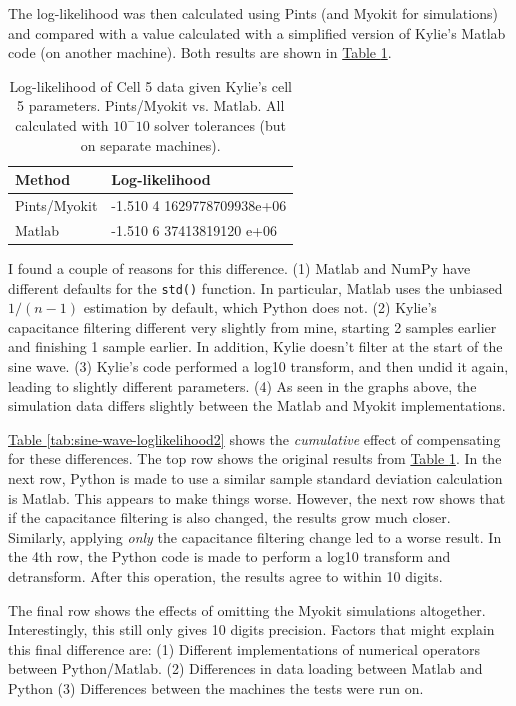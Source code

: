 \documentclass[preprint,authoryear,10pt]{elsarticle}
\newcommand{\startrowcolors}{\rowcolors{2}{gray!15}{white}}
\newcommand*{\thead}[1]{\bfseries #1}
\newcommand{\tab}[1]{\hyperref[tab:#1]{Table \ref*{tab:#1}}}
\newcommand{\Tab}[1]{\hyperref[tab:#1]{Table \ref*{tab:#1}}}
\newcommand{\code}[1]{\texttt{#1}}
\begin{document}
The log-likelihood was then calculated using Pints (and Myokit for simulations)
 and compared with a value calculated with a simplified version of Kylie's
 Matlab code (on another machine).
Both results are shown in \tab{sine-wave-loglikelihood}.

\begin{table}[H]
\centering
\caption{%
Log-likelihood of Cell 5 data given Kylie's cell 5 parameters.
Pints/Myokit vs. Matlab.
All calculated with $10^-10$ solver tolerances (but on separate machines).
}
\label{tab:sine-wave-loglikelihood}
\startrowcolors
\footnotesize
\begin{tabular}{ll}
\hline
\thead{Method} & \thead{Log-likelihood} \\
\hline
Pints/Myokit & -1.510 4 1629778709938e+06 \\
Matlab       & -1.510 6 37413819120  e+06 \\
\hline
\end{tabular}
\end{table}

I found a couple of reasons for this difference.
(1) Matlab and NumPy have different defaults for the \code{std()} function.
In particular, Matlab uses the unbiased $1/(n-1)$ estimation by default, which Python does not.
(2) Kylie's capacitance filtering different very slightly from mine, starting 2 samples earlier and finishing 1 sample earlier.
In addition, Kylie doesn't filter at the start of the sine wave.
(3) Kylie's code performed a log10 transform, and then undid it again, leading to slightly different parameters.
(4) As seen in the graphs above, the simulation data differs slightly between the Matlab and Myokit implementations.

\Tab{sine-wave-loglikelihood2} shows the \emph{cumulative} effect of
 compensating for these differences.
The top row shows the original results from \tab{sine-wave-loglikelihood}.
In the next row, Python is made to use a similar sample standard deviation
 calculation is Matlab.
This appears to make things worse.
However, the next row shows that if the capacitance filtering is also changed,
 the results grow much closer.
Similarly, applying \emph{only} the capacitance filtering change led to a worse
 result.
In the 4th row, the Python code is made to perform a log10 transform and
 detransform.
After this operation, the results agree to within 10 digits.

The final row shows the effects of omitting the Myokit simulations altogether.
Interestingly, this still only gives 10 digits precision.
Factors that might explain this final difference are:
(1) Different implementations of numerical operators between Python/Matlab.
(2) Differences in data loading between Matlab and Python
(3) Differences between the machines the tests were run on.
\end{document}
